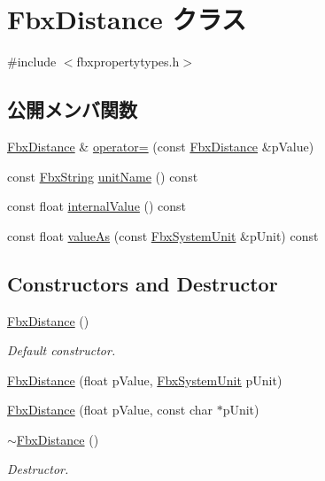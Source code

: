 \hypertarget{class_fbx_distance}{}\section{Fbx\+Distance クラス}
\label{class_fbx_distance}


{\ttfamily \#include $<$fbxpropertytypes.\+h$>$}

\subsection*{公開メンバ関数}
\begin{DoxyCompactItemize}
\item 
\hyperlink{class_fbx_distance}{Fbx\+Distance} \& \hyperlink{class_fbx_distance_a86e23a798f2893137460c5f5bb9c6b9b}{operator=} (const \hyperlink{class_fbx_distance}{Fbx\+Distance} \&p\+Value)
\item 
const \hyperlink{class_fbx_string}{Fbx\+String} \hyperlink{class_fbx_distance_ada4c11c436abc26a08deb903a0c3de1d}{unit\+Name} () const
\item 
const float \hyperlink{class_fbx_distance_a4a54ec421849ca6e2e43cfb400adbfc0}{internal\+Value} () const
\item 
const float \hyperlink{class_fbx_distance_aab3c152aa5f66f2dad580d4a0686ce7f}{value\+As} (const \hyperlink{class_fbx_system_unit}{Fbx\+System\+Unit} \&p\+Unit) const
\end{DoxyCompactItemize}
\subsection*{Constructors and Destructor}
\begin{DoxyCompactItemize}
\item 
\hyperlink{class_fbx_distance_a2584c33efb6d9aac6118abb470592c67}{Fbx\+Distance} ()
\begin{DoxyCompactList}\small\item\em Default constructor. \end{DoxyCompactList}\item 
\hyperlink{class_fbx_distance_ac3516e60b8b7477771d80a3de049d1b2}{Fbx\+Distance} (float p\+Value, \hyperlink{class_fbx_system_unit}{Fbx\+System\+Unit} p\+Unit)
\item 
\hyperlink{class_fbx_distance_aa171246a31a5156574c38208c08ec369}{Fbx\+Distance} (float p\+Value, const char $\ast$p\+Unit)
\item 
\hyperlink{class_fbx_distance_a3100f1352cf1a25bee257fb15788fe86}{$\sim$\+Fbx\+Distance} ()
\begin{DoxyCompactList}\small\item\em Destructor. \end{DoxyCompactList}\end{DoxyCompactItemize}

